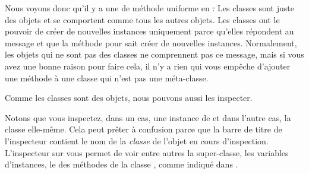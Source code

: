 \documentclass[a4paper,10pt,twoside]{book}
\begin{document}
Nous voyons donc qu'il y a une  de méthode uniforme en \st.
Les classes sont juste des objets et se comportent comme tous les autres objets.
Les classes ont le pouvoir de créer de nouvelles instances uniquement parce qu'elles répondent au message  et que la méthode pour  sait créer de nouvelles instances.
Normalement, les objets qui ne sont pas des classes ne comprennent pas
ce message, mais si vous avez une bonne raison pour faire cela, il n'y a rien qui vous empêche d'ajouter une méthode  à une classe qui n'est pas une méta-classe.

Comme les classes sont des objets, nous pouvons aussi les inspecter.


\noindent
Notons que vous inspectez, dans un cas, une instance de  et
dans l'autre cas, la classe  elle-même.
Cela peut prêter à confusion parce que la barre de titre de l'inspecteur contient le nom de la \emph{classe} de l'objet en cours d'inspection.
L'inspecteur sur  vous permet de voir 
entre autres la super-classe, les variables d'instances, le  des méthodes 
de  la classe , comme indiqué dans .
\end{document}
